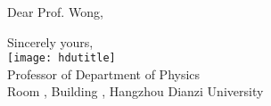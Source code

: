 \documentclass[stationery]{hduthesis}
\begin{document}
\maketitle

Dear Prof. Wong,

\lipsum[1-2]

\vspace{\baselineskip} \raggedleft

Sincerely yours,\\[4ex]
\texttt{[image: hdutitle]}\\[2ex]
Professor of Department of Physics\\
Room , Building , Hangzhou Dianzi University

\clearpage

\notelines[25]
\end{document}
